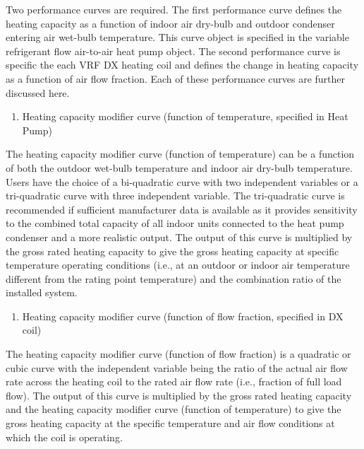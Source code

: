 Two performance curves are required. The first performance curve defines the heating capacity as a function of indoor air dry-bulb and outdoor condenser entering air wet-bulb temperature. This curve object is specified in the variable refrigerant flow air-to-air heat pump object. The second performance curve is specific the each VRF DX heating coil and defines the change in heating capacity as a function of air flow fraction. Each of these performance curves are further discussed here.

\begin{enumerate}
\def\labelenumi{\arabic{enumi})}
\tightlist
\item
  Heating capacity modifier curve (function of temperature, specified in Heat Pump)
\end{enumerate}

The heating capacity modifier curve (function of temperature) can be a function of both the outdoor wet-bulb temperature and indoor air dry-bulb temperature. Users have the choice of a bi-quadratic curve with two independent variables or a tri-quadratic curve with three independent variable. The tri-quadratic curve is recommended if sufficient manufacturer data is available as it provides sensitivity to the combined total capacity of all indoor units connected to the heat pump condenser and a more realistic output. The output of this curve is multiplied by the gross rated heating capacity to give the gross heating capacity at specific temperature operating conditions (i.e., at an outdoor or indoor air temperature different from the rating point temperature) and the combination ratio of the installed system.

\begin{enumerate}
\def\labelenumi{\arabic{enumi})}
\setcounter{enumi}{1}
\tightlist
\item
  Heating capacity modifier curve (function of flow fraction, specified in DX coil)
\end{enumerate}

The heating capacity modifier curve (function of flow fraction) is a quadratic or cubic curve with the independent variable being the ratio of the actual air flow rate across the heating coil to the rated air flow rate (i.e., fraction of full load flow). The output of this curve is multiplied by the gross rated heating capacity and the heating capacity modifier curve (function of temperature) to give the gross heating capacity at the specific temperature and air flow conditions at which the coil is operating.


